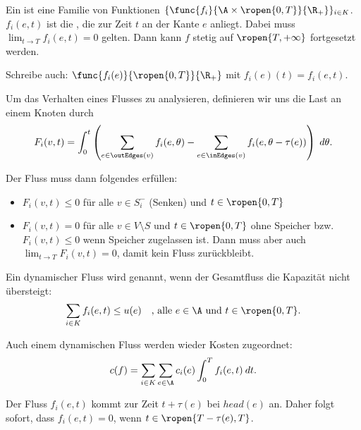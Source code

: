 \begin{definition}
    Ein  ist eine Familie von Funktionen
    $\{\func{f_i}{\A \times \ropen{0,T}}{\R_+}\}_{i \in K}$.
    $f_i(e,t)$ ist die , die zur Zeit $t$ an der Kante $e$ anliegt.
    Dabei muss \\ $\lim_{t \to T} f_i(e,t) = 0$ gelten. Dann kann $f$ stetig
    auf $\ropen{T, +\infty}$ fortgesetzt werden.

    Schreibe auch: $\func{f_i(e)}{\ropen{0,T}}{\R_+}$ mit $f_i(e)(t) = f_i(e,t)$.

    Um das Verhalten eines Flusses zu analysieren, definieren wir uns die Last an
    einem Knoten durch
    \[
        F_i(v, t) =
            \int_0^t \left(
                \sum_{e \in \outEdges(v)} f_i(e, \theta) -
                \sum_{e \in \inEdges(v)} f_i(e, \theta - \tau(e)) \right) \;d\theta .
    \]

    Der Fluss muss dann folgendes erfüllen:
    \begin{itemize}
        \item $F_i(v, t) \leq 0$ für alle $v \in S_i^-$ (Senken)
            und $t \in \ropen{0,T}$
        \item $F_i(v, t) = 0$ für alle $v \in V \setminus S$ und $t \in \ropen{0,T}$
            ohne Speicher bzw. $F_i(v, t) \leq 0$ wenn Speicher zugelassen ist.
            Dann muss aber auch $\lim_{t \to T} F_i(v, t) = 0$,
            damit kein Fluss zurückbleibt.
    \end{itemize}


    Ein dynamischer Fluss wird  genannt, wenn der Gesamtfluss
    die Kapazität nicht übersteigt:
    \[
        \sum_{i \in K} f_i(e,t) \leq u(e) \quad \text{, alle } e \in \A
                                                \text{ und } t \in \ropen{0,T}.
    \]

    Auch einem dynamischen Fluss werden wieder Kosten zugeordnet:
    \[
        c(f) = \sum_{i \in K} \sum_{e \in \A} c_i(e) \int_0^T f_i(e,t) \: dt.
    \]
\end{definition}

\begin{remark}
    Der Fluss $f_i(e,t)$ kommt zur Zeit $t + \tau(e)$ bei $head(e)$ an. Daher folgt
    sofort, dass $f_i(e,t) = 0$, wenn $t \in \ropen{T - \tau(e), T}$.
\end{remark}

